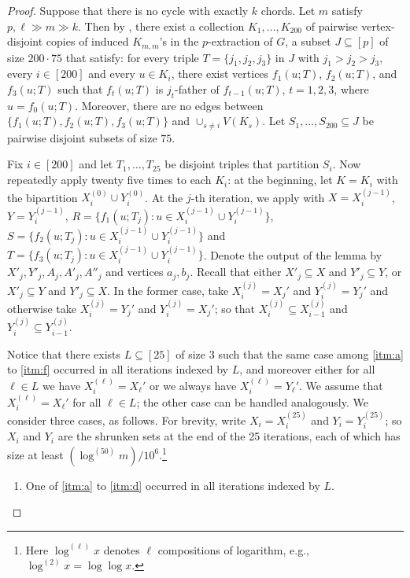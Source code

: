 \documentclass[11pt,english]{article}
\theoremstyle{plain}
\theoremstyle{definition}
\theoremstyle{remark}
\begin{document}
    \begin{proof}
        Suppose that there is no cycle with exactly $k$ chords. 
        Let $m$ satisfy $p, \ell \gg m \gg k$. 
        Then by , there exist a collection $K_1, \ldots, K_{200}$ of pairwise vertex-disjoint copies of induced $K_{m,m}$'s in the $p$-extraction of $G$, a subset $J \subseteq [p]$ of size $200 \cdot 75$ that satisfy:
        for every triple $T=\{j_1,j_2,j_3\}$ in $J$ with $j_1>j_2>j_3$, every $i\in[200]$ and every $u\in K_i$,
        there exist vertices $f_{1}(u;T)$, $f_{2}(u;T)$,  and $f_{3}(u;T)$
        such that $f_t(u;T)$ is $j_t$-father of $f_{t-1}(u;T)$, $t=1,2,3$, where $u=f_0(u;T)$. Moreover, there are no edges between $\{f_{1}(u;T),f_{2}(u;T),f_{3}(u;T)\}$ and $\cup_{s\neq i}V(K_s)$.
        Let $S_1, \ldots, S_{200}\subseteq J$ be pairwise disjoint subsets of size $75$.

        Fix $i \in [200]$ and let $T_{1}, \ldots, T_{25}$ be disjoint triples that partition $S_i$. Now repeatedly apply  twenty five times to each $K_i$: at the beginning, let $K=K_i$ with the bipartition $X_i^{(0)}\cup Y_i^{(0)}$. At the $j$-th iteration, we apply  with $X=X_i^{(j-1)}$, $Y=Y_i^{(j-1)}$, $R=\{f_{1}(u;T_j) : u \in X_i^{(j-1)} \cup Y_i^{(j-1)}\}$, $S=\{f_{2}(u;T_j) : u \in X_i^{(j-1)} \cup Y_i^{(j-1)}\}$ and $T=\{f_{3}(u;T_j) : u \in X_i^{(j-1)} \cup Y_i^{(j-1)}\}$.
        Denote the output of the lemma by $X'_{j}, Y'_{j}, A_{j}, A'_{j}, A''_{j}$ and vertices $a_{j},b_{j}$. Recall that either $X'_{j} \subseteq X$ and $Y'_{j} \subseteq Y$, or $X'_{j} \subseteq Y$ and $Y'_{j} \subseteq X$.
        In the former case, take $X_i^{(j)} = X_{j}'$ and $Y_i^{(j)} = Y_{j}'$ and otherwise take $X_i^{(j)} = Y_{j}'$ and $Y_i^{(j)} = X_{j}'$; so that $X_i^{(j)} \subseteq X_{i-1}^{(j)}$ and $Y_i^{(j)} \subseteq Y_{i-1}^{(j)}$. 

        Notice that there exists $L \subseteq [25]$ of size $3$ such that the same case among \ref{itm:a} to \ref{itm:f} occurred in all iterations indexed by $L$, and moreover either for all $\ell \in L$ we have $X_i^{(\ell)} = X_{\ell}'$ or we always have $X_i^{(\ell)} = Y_{\ell}'$.
		We assume that $X_i^{(\ell)} = X_\ell'$ for all $\ell \in L$; the other case can be handled analogously.
		We consider three cases, as follows.
        For brevity, write $X_i = X_i^{(25)}$ and $Y_i = Y_i^{(25)}$; so $X_i$ and $Y_i$ are the shrunken sets at the end of the 25 iterations, each of which has size at least $(\log ^{(50)} m) / 10^6$.\footnote{Here 
        $\log ^{(\ell)} x$ denotes $\ell$ compositions of logarithm, e.g., $\log^{(2)}x = \log\log x$.}
        \begin{enumerate} [label = \rm(\arabic*)]
            \item \label{itm:easy-case}
				One of \ref{itm:a} to \ref{itm:d} occurred in all iterations indexed by $L$.


\end{enumerate}
\end{proof}
\end{document}
